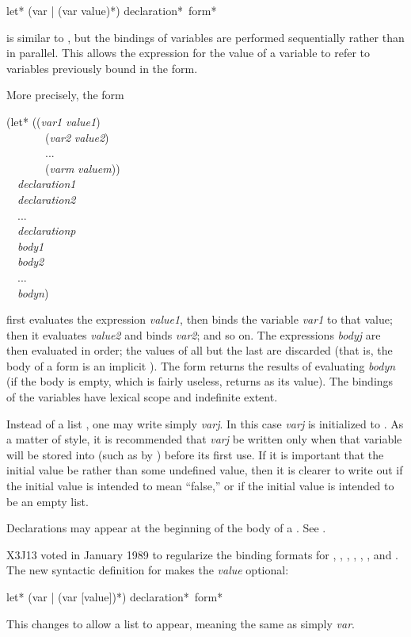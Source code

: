 \begin{defspec}
let* ({var | (var value)}*) {declaration}* {\,form}*

 is similar to , but the bindings of variables
are performed sequentially rather than in parallel.  This allows
the expression for the value of a variable to refer to variables
previously bound in the  form.

More precisely, the form
\begin{lisp}
(let* (({\it var1} {\it value1}) \\
~~~~~~~({\it var2} {\it value2}) \\
~~~~~~~... \\
~~~~~~~({\it varm} {\it valuem})) \\
~~{\it declaration1} \\
~~{\it declaration2} \\
~~... \\
~~{\it declarationp} \\
~~{\it body1} \\
~~{\it body2} \\
~~... \\
~~{\it bodyn})
\end{lisp}
first evaluates the expression {\it value1}, then binds the variable
{\it var1} to that value; then it evaluates {\it value2} and binds {\it var2};
and so on.
The expressions {\it bodyj} are then evaluated
in order; the values of all but the last are discarded
(that is, the body of a  form is an implicit ).
The  form returns the results of evaluating {\it bodyn} (if the
body is empty, which is fairly useless,  returns {\false} as its value).
The bindings of the variables have lexical scope and indefinite extent.

Instead of a list , one may write simply {\it varj}.
In this case {\it varj} is initialized to {\false}.  As a matter of style,
it is recommended that {\it varj} be written only when that variable
will be stored into (such as by ) before its first use.
If it is important that the initial value be {\nil} rather than
some undefined value, then it is clearer to write out
 if the initial value is intended to mean ``false,'' or
 if the initial value is intended to be an empty
list.

Declarations may appear at the beginning of the body of a .
See .

\begin{new}
X3J13 voted in January 1989
to regularize the binding formats for , , ,
, , , and .
The new syntactic definition for  makes the {\it value} optional:

\begin{defmac}
let* ({var | (var [value])}*) {declaration}* {\,form}*

This changes  to allow a list  to appear,
meaning the same as simply {\it var}.
\end{defmac}
\end{new}
\end{defspec}
